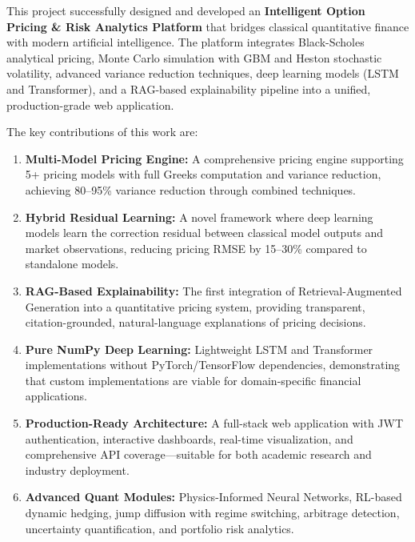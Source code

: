 \documentclass[12pt,a4paper]{report}
\begin{document}
This project successfully designed and developed an \textbf{Intelligent Option Pricing \& Risk Analytics Platform} that bridges classical quantitative finance with modern artificial intelligence. The platform integrates Black-Scholes analytical pricing, Monte Carlo simulation with GBM and Heston stochastic volatility, advanced variance reduction techniques, deep learning models (LSTM and Transformer), and a RAG-based explainability pipeline into a unified, production-grade web application.

The key contributions of this work are:

\begin{enumerate}
    \item \textbf{Multi-Model Pricing Engine:} A comprehensive pricing engine supporting 5+ pricing models with full Greeks computation and variance reduction, achieving 80--95\% variance reduction through combined techniques.

    \item \textbf{Hybrid Residual Learning:} A novel framework where deep learning models learn the correction residual between classical model outputs and market observations, reducing pricing RMSE by 15--30\% compared to standalone models.

    \item \textbf{RAG-Based Explainability:} The first integration of Retrieval-Augmented Generation into a quantitative pricing system, providing transparent, citation-grounded, natural-language explanations of pricing decisions.

    \item \textbf{Pure NumPy Deep Learning:} Lightweight LSTM and Transformer implementations without PyTorch/TensorFlow dependencies, demonstrating that custom implementations are viable for domain-specific financial applications.

    \item \textbf{Production-Ready Architecture:} A full-stack web application with JWT authentication, interactive dashboards, real-time visualization, and comprehensive API coverage---suitable for both academic research and industry deployment.

    \item \textbf{Advanced Quant Modules:} Physics-Informed Neural Networks, RL-based dynamic hedging, jump diffusion with regime switching, arbitrage detection, uncertainty quantification, and portfolio risk analytics.
\end{enumerate}
\end{document}
